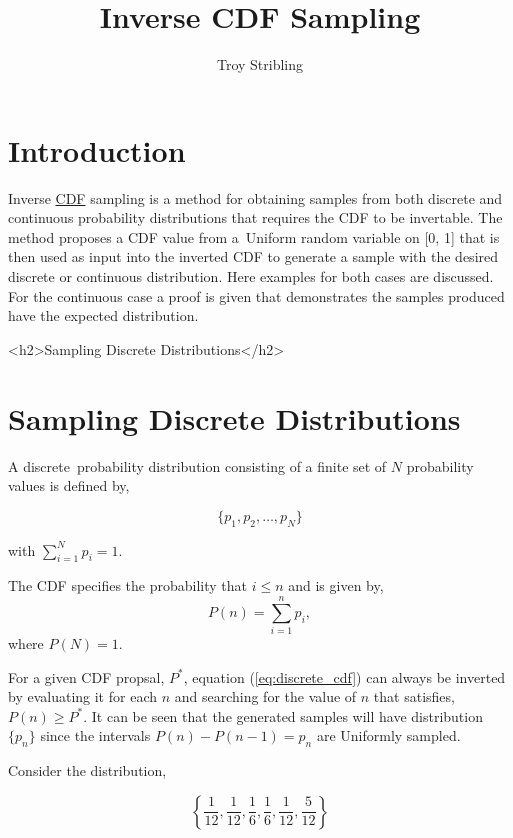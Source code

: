 \documentclass[12pt]{article}
\title{Inverse CDF Sampling}
\author{Troy Stribling}
\begin{document}
\iftex
\maketitle
\section{Introduction}
\fi

Inverse \href{https://en.wikipedia.org/wiki/Cumulative_distribution_function}{CDF} sampling is a method for obtaining samples from both discrete and continuous probability distributions
that requires the CDF to be invertable.
The method proposes a CDF value from a Uniform random variable on [0, 1] that is then used as input
into the inverted CDF to generate a sample
with the desired discrete or continuous distribution. Here examples for both cases are discussed.
For the continuous case a proof is given that demonstrates the samples produced have the expected distribution.


\ifblog
<h2>Sampling Discrete Distributions</h2>
\fi
\iftex
\section{Sampling Discrete Distributions}
\fi

A discrete probability distribution consisting of a finite set of $N$ probability values is defined by,

$$\{p_1, p_2,\ldots,p_N\}$$

with $\sum_{i=1}^N{p_i} = 1.$

The CDF specifies the probability that $i \leq n$ and is given by,
\begin{equation}
\label{eq:discrete_cdf}
P(n)=\sum_{i=1}^n{p_i},
\end{equation}
where $P(N)=1.$

For a given CDF propsal, $P^*$, equation (\ref{eq:discrete_cdf}) can always be inverted by evaluating it for each $n$ and
searching for the value of $n$ that satisfies, $P(n) \geq P^*.$ It can be seen that the generated samples will have
distribution $\{p_n\}$ since the intervals $P(n) - P(n-1) = p_n$ are Uniformly sampled.


Consider the distribution,

\begin{equation} 
\label{eq:discrete}
\left \{\frac{1}{12}, \frac{1}{12}, \frac{1}{6}, \frac{1}{6}, \frac{1}{12}, \frac{5}{12} \right\}
\end{equation}
\end{document}
